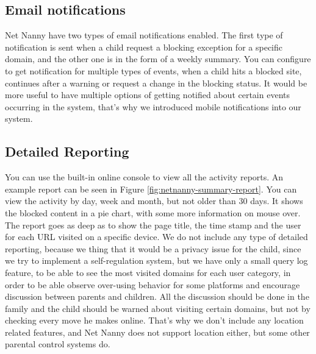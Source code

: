 \subsection{Email notifications}

Net Nanny have two types of email notifications enabled. The first type of notification is sent when a child request a blocking exception for a specific domain, and the other one is in the form of a weekly summary. You can configure to get notification for multiple types of events, when a child hits a blocked site, continues after a warning or request a change in the blocking status. It would be more useful to have multiple options of getting notified about certain events occurring in the system, that's why we introduced mobile notifications into our system.

\subsection{Detailed Reporting}

You can use the built-in online console to view all the activity reports. An example report can be seen in Figure \ref{fig:netnanny-summary-report}. You can view the activity by day, week and month, but not older than 30 days. It shows the blocked content in a pie chart, with some more information on mouse over. The report goes as deep as to show the page title, the time stamp and the user for each URL visited on a specific device. We do not include any type of detailed reporting, because we thing that it would be a privacy issue for the child, since we try to implement a self-regulation system, but we have only a small query log feature, to be able to see the most visited domains for each user category, in order to be able observe over-using behavior for some platforms and encourage discussion between parents and children. All the discussion should be done in the family and the child should be warned about visiting certain domains, but not by checking every move he makes online. That's why we don't include any location related features, and Net Nanny does not support location either, but some other parental control systems do.

